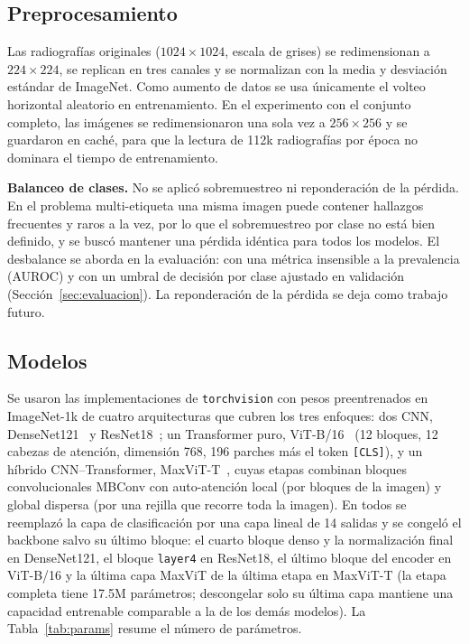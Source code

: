 \documentclass[conference]{IEEEtran}
\begin{document}
\subsection{Preprocesamiento}
Las radiografías originales ($1024\times1024$, escala de grises) se redimensionan a $224\times224$, se replican en tres canales y se normalizan con la media y desviación estándar de ImageNet. Como aumento de datos se usa únicamente el volteo horizontal aleatorio en entrenamiento. En el experimento con el conjunto completo, las imágenes se redimensionaron una sola vez a $256\times256$ y se guardaron en caché, para que la lectura de 112k radiografías por época no dominara el tiempo de entrenamiento.

\textbf{Balanceo de clases.} No se aplicó sobremuestreo ni reponderación de la pérdida. En el problema multi-etiqueta una misma imagen puede contener hallazgos frecuentes y raros a la vez, por lo que el sobremuestreo por clase no está bien definido, y se buscó mantener una pérdida idéntica para todos los modelos. El desbalance se aborda en la evaluación: con una métrica insensible a la prevalencia (AUROC) y con un umbral de decisión por clase ajustado en validación (Sección~\ref{sec:evaluacion}). La reponderación de la pérdida se deja como trabajo futuro.

\subsection{Modelos}
Se usaron las implementaciones de \texttt{torchvision} con pesos preentrenados en ImageNet-1k de cuatro arquitecturas que cubren los tres enfoques: dos CNN, DenseNet121~\cite{huang2017densenet} y ResNet18~\cite{he2016resnet}; un Transformer puro, ViT-B/16~\cite{dosovitskiy2021vit} (12 bloques, 12 cabezas de atención, dimensión 768, 196 parches más el token \texttt{[CLS]}), y un híbrido CNN--Transformer, MaxViT-T~\cite{tu2022maxvit}, cuyas etapas combinan bloques convolucionales MBConv con auto-atención local (por bloques de la imagen) y global dispersa (por una rejilla que recorre toda la imagen). En todos se reemplazó la capa de clasificación por una capa lineal de 14 salidas y se congeló el backbone salvo su último bloque: el cuarto bloque denso y la normalización final en DenseNet121, el bloque \texttt{layer4} en ResNet18, el último bloque del encoder en ViT-B/16 y la última capa MaxViT de la última etapa en MaxViT-T (la etapa completa tiene 17.5M parámetros; descongelar solo su última capa mantiene una capacidad entrenable comparable a la de los demás modelos). La Tabla~\ref{tab:params} resume el número de parámetros.
\end{document}
